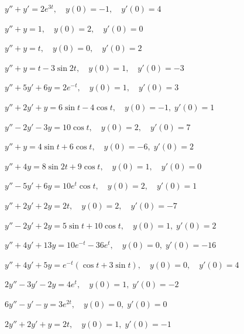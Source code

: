 \begin{exerciselist}
  \item\label{exer:8.3.18} $y''+y'=2e^{3t},\quad y(0)=-1,\quad y'(0)=4$

  \item\label{exer:8.3.19} $y''+y=1,\quad y(0)=2,\quad y'(0)=0$

  \item\label{exer:8.3.20} $y''+y=t,\quad y(0)=0,\quad y'(0)=2$

  \item\label{exer:8.3.21} $y''+y=t-3\sin2t,\quad y(0)=1,\quad y'(0)=-3$

  \item\label{exer:8.3.22} $y''+5y'+6y=2e^{-t},\quad y(0)=1,\quad y'(0)=3$

  \item\label{exer:8.3.23} $y''+2y'+y=6\sin t-4\cos t,\quad y(0)=-1,\; y'(0)=1$

  \item\label{exer:8.3.24} $y''-2y'-3y=10\cos t,\quad y(0)=2,\quad y'(0)=7$

  \item\label{exer:8.3.25} $y''+y=4\sin t+6\cos t,\quad y(0)=-6,\; y'(0)=2$

  \item\label{exer:8.3.26} $y''+4y=8\sin2t+9\cos t,\quad y(0)=1,\quad y'(0)=0$

  \item\label{exer:8.3.27} $y''-5y'+6y=10e^{t}\cos t,\quad y(0)=2,\quad y'(0)=1$

  \item\label{exer:8.3.28} $y''+2y'+2y=2t,\quad y(0)=2,\quad y'(0)=-7$

  \item\label{exer:8.3.29} $y''-2y'+2y=5\sin t+10\cos t,\quad y(0)=1,\; y'(0)=2$

  \item\label{exer:8.3.30} $y''+4y'+13y=10e^{-t}-36e^{t},\quad y(0)=0,\; y'(0)=-16$

  \item\label{exer:8.3.31} $y''+4y'+5y=e^{-t}(\cos t+3\sin t),\quad y(0)=0,\quad y'(0)=4$

  \item\label{exer:8.3.32} $2y''-3y'-2y=4e^{t},\quad y(0)=1,\;y'(0)=-2$

  \item\label{exer:8.3.33} $6y''-y'-y=3e^{2t},\quad y(0)=0,\;y'(0)=0$

  \item\label{exer:8.3.34} $2y''+2y'+y=2t,\quad y(0)=1,\;y'(0)=-1$


\end{exerciselist}
